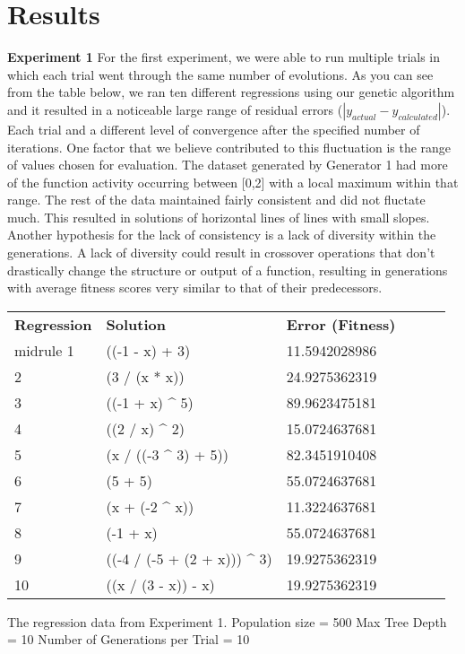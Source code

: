 
\section{Results}
\label{sec:results}

\textbf{Experiment 1}
For the first experiment, we were able to run multiple trials in which each trial went through the same number of evolutions. As you can see from the table below, we ran ten different regressions using our genetic algorithm and it resulted in a noticeable large range of residual errors ($|y_{actual} - y_{calculated}|$). Each trial and a different level of convergence after the specified number of iterations. One factor that we believe contributed to this fluctuation is the range of values chosen for evaluation. The dataset generated by Generator 1 had more of the function activity occurring between [0,2] with a local maximum within that range. The rest of the data maintained fairly consistent and did not fluctate much. This resulted in solutions of horizontal lines of lines with small slopes. \\

Another hypothesis for the lack of consistency is a lack of diversity within the generations. A lack of diversity could result in crossover operations that don't drastically change the structure or output of a function, resulting in generations with average fitness scores very similar to that of their predecessors.

\begin{minipage}{\linewidth}
\centering
{} \label{tab:title} 
\begin{tabular}{ C{1.25in} C{.85in} *4{C{.75in}}}\toprule[1.5pt]
\bf Regression & \bf Solution & \bf Error (Fitness) \\midrule
1        &  ((-1 - x) + 3)     & 11.5942028986 \\
2        &  (3 / (x * x))     & 24.9275362319 \\
3        &  ((-1 + x) ^ 5)   & 89.9623475181  \\
4        &  ((2 / x) ^ 2)     & 15.0724637681 \\
5        &  (x / ((-3 ^ 3) + 5))     & 82.3451910408 \\
6        &  (5 + 5)     & 55.0724637681  \\
7        &  (x + (-2 ^ x))     & 11.3224637681 \\
8        &  (-1 + x)     & 55.0724637681 \\
9        &  ((-4 / (-5 + (2 + x))) ^ 3)     & 19.9275362319  \\
10        &  ((x / (3 - x)) - x)     & 19.9275362319  \\
\bottomrule[1.25pt]
\end {tabular}\par
\bigskip
The regression data from Experiment 1.
Population size = 500
Max Tree Depth = 10
Number of Generations per Trial = 10
\end{minipage}

